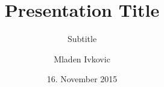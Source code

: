 




\title{Presentation Title}
\subtitle{Subtitle}

\author[M. Ivkovic]{Mladen Ivkovic}
\date[16.11.15]{16. November 2015}










% 
% 
% 
% 
% 







